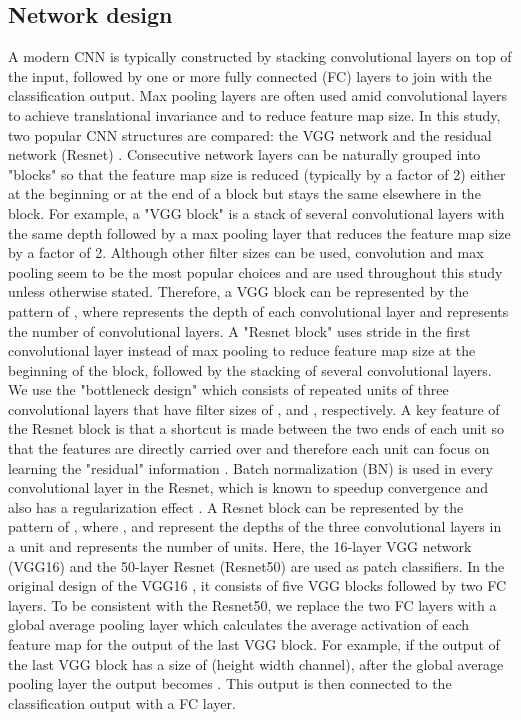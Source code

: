 \documentclass[12pt,letterpaper]{article}
\begin{document}
\subsection{Network design}
A modern CNN is typically constructed by stacking convolutional layers on top of the input, followed by one or more fully connected (FC) layers to join with the classification output. Max pooling layers are often used amid convolutional layers to achieve translational invariance and to reduce feature map size. In this study, two popular CNN structures are compared: the VGG network \cite{simonyan_very_2014} and the residual network (Resnet) \cite{he_deep_2015}. Consecutive network layers can be naturally grouped into "blocks" so that the feature map size is reduced (typically by a factor of 2) either at the beginning or at the end of a block but stays the same elsewhere in the block. For example, a "VGG block" is a stack of several  convolutional layers with the same depth followed by a  max pooling layer that reduces the feature map size by a factor of 2. Although other filter sizes can be used,  convolution and  max pooling seem to be the most popular choices and are used throughout this study unless otherwise stated. Therefore, a VGG block can be represented by the pattern of , where  represents the depth of each convolutional layer and  represents the number of convolutional layers. A "Resnet block" uses stride in the first convolutional layer instead of  max pooling to reduce feature map size at the beginning of the block, followed by the stacking of several convolutional layers. We use the "bottleneck design" \cite{he_deep_2015} which consists of repeated units of three convolutional layers that have filter sizes of ,  and , respectively. A key feature of the Resnet block is that a shortcut is made between the two ends of each unit so that the features are directly carried over and therefore each unit can focus on learning the "residual" information \cite{he_deep_2015}. Batch normalization (BN) is used in every convolutional layer in the Resnet, which is known to speedup convergence and also has a regularization effect \cite{ioffe_batch_2015}. A Resnet block can be represented by the pattern of , where ,  and  represent the depths of the three convolutional layers in a unit and  represents the number of units. Here, the 16-layer VGG network (VGG16) and the 50-layer Resnet (Resnet50) are used as patch classifiers. In the original design of the VGG16 \cite{simonyan_very_2014}, it consists of five VGG blocks followed by two FC layers. To be consistent with the Resnet50, we replace the two FC layers with a global average pooling layer which calculates the average activation of each feature map for the output of the last VGG block. For example, if the output of the last VGG block has a size of  (height  width  channel), after the global average pooling layer the output becomes . This output is then connected to the classification output with a FC layer.
\end{document}
